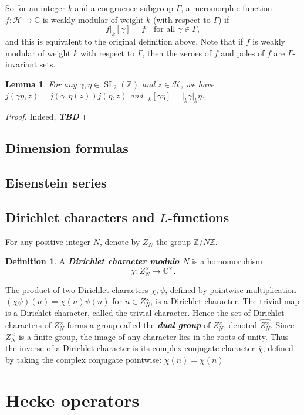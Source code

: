 \documentclass[10pt,leqno]{article}
\theoremstyle{plain}
\newtheorem{lemma}[lem]{Lemma}
\theoremstyle{definition}
\newtheorem{definition}[lem]{Definition}
\numberwithin{equation}{section}
\numberwithin{lem}{section}
\newcommand{\textib}[1]{\textbf{\textit{#1}}}
\DeclareMathOperator{\SL}{SL}
\newcommand{\slz}{\SL_2(\mathbb{Z})}
\begin{document}
So for an integer $k$ and a congruence subgroup $\varGamma$, a meromorphic function $f\colon \mathcal H \to \mathbb{C}$ is weakly modular of weight $k$ (with respect to $\varGamma$) if \[f|_k[\gamma] = f\quad\text{for all }\gamma\in \varGamma,\] and this is equivalent to the original definition above. Note that if $f$ is weakly modular of weight $k$ with respect to $\varGamma$, then the zeroes of $f$ and poles of $f$ are $\varGamma$-invariant sets.

\begin{lemma}\label{lem: props of automorphy}
    For any $\gamma,\eta\in \slz$ and $z\in \mathcal H$, we have $j(\gamma\eta,z) = j(\gamma,\eta(z))j(\eta,z)$ and $|_k[\gamma\eta] = |_k\gamma|_k\eta$.
\end{lemma}
\begin{proof}
    Indeed, \textib{TBD}
\end{proof}
\subsection{Dimension formulas}
\subsection{Eisenstein series}
\subsection{Dirichlet characters and $L$-functions}
For any positive integer $N$, denote by $Z_N$ the group $\mathbb{Z}/N\mathbb{Z}$.
\begin{definition}
    A \textib{Dirichlet character modulo $N$} is a homomorphism 
    \[\chi\colon Z_N^\times\to \mathbb{C}^\times.\]
\end{definition}
The product of two Dirichlet characters $\chi,\psi$, defined by pointwise multiplication $(\chi\psi)(n) = \chi(n)\psi(n)$ for $n\in Z_N^\times$, is a Dirichlet character. The trivial map is a Dirichlet character, called the trivial character. Hence the set of Dirichlet characters of $Z_N^\times$ forms a group called the \textib{dual group} of $Z_N^\times$, denoted $\widehat{Z_N^\times}$. Since $Z_N^\times$ is a finite group, the image of any character lies in the roots of unity. Thus the inverse of a Dirichlet character is its complex conjugate character $\overline \chi$, defined by taking the complex conjugate pointwise: $\overline\chi(n) = \overline{\chi(n)}$

\newpage\section{Hecke operators}
\end{document}
